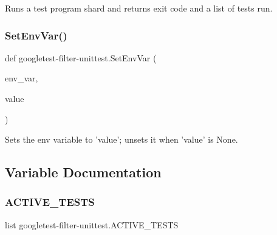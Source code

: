 \begin{DoxyVerb}Runs a test program shard and returns exit code and a list of tests run.\end{DoxyVerb}
 \mbox{\label{namespacegoogletest-filter-unittest_a829bf5a2df452c96f0ad7a1f0d47401e}} 
\subsubsection{\texorpdfstring{SetEnvVar()}{SetEnvVar()}}
{\footnotesize\ttfamily def googletest-\/filter-\/unittest.\+Set\+Env\+Var (\begin{DoxyParamCaption}\item[{}]{env\+\_\+var,  }\item[{}]{value }\end{DoxyParamCaption})}

\begin{DoxyVerb}Sets the env variable to 'value'; unsets it when 'value' is None.\end{DoxyVerb}
 

\subsection{Variable Documentation}
\mbox{\label{namespacegoogletest-filter-unittest_a9c76128524d4e2787c76acf5c87ebb70}} 
\subsubsection{\texorpdfstring{ACTIVE\_TESTS}{ACTIVE\_TESTS}}
{\footnotesize\ttfamily list googletest-\/filter-\/unittest.\+A\+C\+T\+I\+V\+E\+\_\+\+T\+E\+S\+TS}

